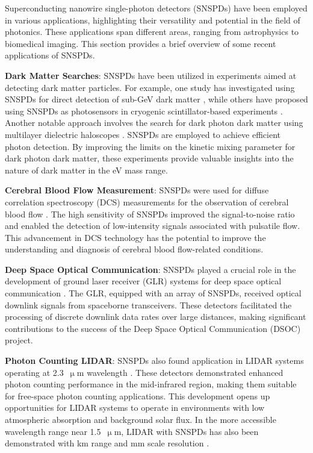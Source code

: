 \documentclass[11pt]{caltech_thesis} %
\begin{document}
Superconducting nanowire single-photon detectors (SNSPDs) have been employed in various applications, highlighting their versatility and potential in the field of photonics. These applications span different areas, ranging from astrophysics to biomedical imaging. This section provides a brief overview of some recent applications of SNSPDs.

\textbf{Dark Matter Searches}: SNSPDs have been utilized in experiments aimed at detecting dark matter particles. For example, one study has investigated using SNSPDs for direct detection of sub-GeV dark matter \autocite{Hochberg2019}, while others have proposed using SNSPDs as photosensors in cryogenic scintillator-based experiments \autocite{Bourret2021}. Another notable approach involves the search for dark photon dark matter using multilayer dielectric haloscopes \autocite[\textcite{Liu2022}]{Chiles2022}. SNSPDs are employed to achieve efficient photon detection. By improving the limits on the kinetic mixing parameter for dark photon dark matter, these experiments provide valuable insights into the nature of dark matter in the eV mass range.

\textbf{Cerebral Blood Flow Measurement}: SNSPDs were used for diffuse correlation spectroscopy (DCS) measurements for the observation of cerebral blood flow \autocite{Ozana2021}. The high sensitivity of SNSPDs improved the signal-to-noise ratio and enabled the detection of low-intensity signals associated with pulsatile flow. This advancement in DCS technology has the potential to improve the understanding and diagnosis of cerebral blood flow-related conditions.

\textbf{Deep Space Optical Communication}: SNSPDs played a crucial role in the development of ground laser receiver (GLR) systems for deep space optical communication \autocite{Srinivasan2023GroundReceiver}. The GLR, equipped with an array of SNSPDs, received optical downlink signals from spaceborne transceivers. These detectors facilitated the processing of discrete downlink data rates over large distances, making significant contributions to the success of the Deep Space Optical Communication (DSOC) project.

\textbf{Photon Counting LIDAR}: SNSPDs also found application in LIDAR systems operating at 2.3~$\upmu \mathrm{m}$ wavelength \autocite{Taylor2019}. These detectors demonstrated enhanced photon counting performance in the mid-infrared region, making them suitable for free-space photon counting applications. This development opens up opportunities for LIDAR systems to operate in environments with low atmospheric absorption and background solar flux. In the more accessible wavelength range near 1.5~$\upmu \mathrm{m}$, LIDAR with SNSPDs has also been demonstrated with km range \autocite{McCarthy2013} and mm scale resolution \autocite{Zhou2015}.
\end{document}
